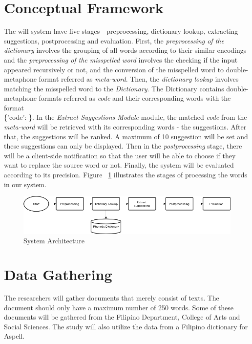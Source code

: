 \documentclass[12pt]{book}
\begin{document}
\section{Conceptual Framework}
The will system have five stages - preprocessing, dictionary lookup, extracting suggestions, postprocessing and evaluation. First, the \textit{preprocessing of the dictionary} involves the grouping of all words according to their similar encodings and the \textit{preprocessing of the misspelled word} involves the checking if the input appeared recursively or not, and the conversion of the misspelled word to double-metaphone format referred as \textit{meta-word}. Then, the \textit{dictionary lookup} involves matching the misspelled word to the \textit{Dictionary}. The Dictionary contains double-metaphone formats referred as \textit{code} and their corresponding words with the format \\
\{'code': \}. In the \textit{Extract Suggestions Module} module, the matched \textit{code} from the \textit{meta-word} will be retrieved with its corresponding words - the suggestions.  After that, the suggestions will be ranked. A maximum of 10 suggestion will be set and these suggestions can only be displayed. Then in the \textit{postprocessing} stage, there will be a client-side notification so that the user will be able to choose if they want to replace the source word or not. Finally, the system will be evaluated according to its precision. Figure ~\ref{systemarchitecture} illustrates the stages of processing the words in our system.

\begin{figure}
\begin{center}
\includegraphics[scale=.50]{systemarchitecture.png}
	\caption[System Architecture]
	{System Architecture}
	\label{systemarchitecture}
\end{center}
\end{figure}

\section{Data Gathering}
The researchers will gather documents that merely consist of texts. The document should only have a maximum number of 250 words. Some of these documents will be gathered from the Filipino Department, College of Arts and Social Sciences. The study will also utilize the data from a Filipino dictionary for Aspell.
\end{document}
